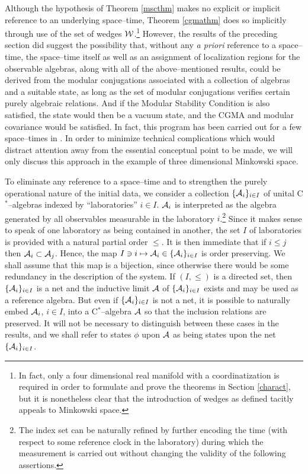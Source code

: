 \documentclass[12pt]{article}
\def\inet{{\{\As_i\}_{i \in I}}}
\def\As{{\cal A}}
\def\Ws{{\cal W}}
\begin{document}
     Although the hypothesis of Theorem \ref{mscthm} makes no explicit
or implicit reference to an underlying space--time, Theorem
\ref{cgmathm} does so implicitly through use of the set of wedges
$\Ws$.\footnote{In fact, only a four dimensional real manifold with a
coordinatization is required in order to formulate and prove the
theorems in Section \ref{charact}, but it is nonetheless clear that
the introduction of wedges as defined tacitly appeals to Minkowski
space.}  However, the results of the preceding section did suggest the
possibility that, without any {\it a priori} reference to a
space--time, the space--time itself as well as an assignment of
localization regions for the observable algebras, along with all of
the above--mentioned results, could be derived from the modular
conjugations associated with a collection of algebras and a suitable
state, as long as the set of modular conjugations verifies certain
purely algebraic relations. And if the Modular Stability Condition is
also satisfied, the state would then be a vacuum state, and the CGMA and
modular covariance would be satisfied.  In fact, this program has been
carried out for a few space--times in \cite{SuWh,SuWh2,SuWh3,Wh}.  In
order to minimize technical complications which would distract
attention away from the essential conceptual point to be made, we will
only discuss this approach in the example of three dimensional
Minkowski space.
          
     To eliminate any reference to a space--time and to strengthen
the purely operational nature of the initial data, we consider a 
collection $\inet$ of unital C$^*$--algebras indexed by ``laboratories''
$i \in I$. $\As_i$ is interpreted as the algebra generated by all
observables measurable in the laboratory $i$.\footnote{The index
set can be naturally refined by further encoding the time (with
respect to some reference clock in the laboratory) during which the
measurement is carried out without changing the validity of the
following assertions.} Since it makes sense
to speak of one laboratory as being contained in another, the
set $I$ of laboratories is provided with a natural partial order
$\leq$. It is then immediate that if $i \leq j$ then
$\As_i \subset \As_j$. Hence, the map $I \ni i \mapsto \As_i \in \inet$ 
is order preserving. We shall assume that this map is a bijection,
since otherwise there would be some redundancy in the description
of the system. If $(I,\leq)$ is a directed set, then $\inet$ is a
net and the inductive limit $\As$ of $\inet$ exists and may be
used as a reference algebra. But even if $\inet$ is not a net,
it is possible \cite{Fred} to naturally embed $\As_i$, $i \in I$,
into a C$^*$--algebra $\As$ so that the inclusion relations are
preserved. It will not be necessary to distinguish between these
cases in the results, and we shall refer to states $\phi$ upon
$\As$ as being states upon the net $\inet$.  
\end{document}
